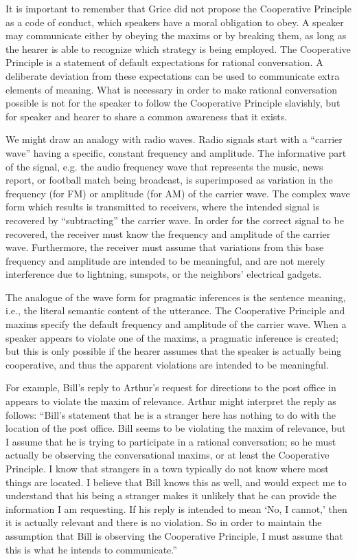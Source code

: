 It is important to remember that Grice did not propose the Cooperative Principle as a code of conduct, which speakers have a moral obligation to obey. A speaker may communicate either by obeying the maxims or by breaking them, as long as the hearer is able to recognize which strategy is being employed. The Cooperative Principle is a statement of default expectations for rational conversation. A deliberate deviation from these expectations can be used to communicate extra elements of meaning. What is necessary in order to make rational conversation possible is not for the speaker to follow the Cooperative Principle slavishly, but for speaker and hearer to share a common awareness that it exists.



We might draw an analogy with radio waves. Radio signals start with a “carrier wave” having a specific, constant frequency and amplitude. The informative part of the signal, e.g. the audio frequency wave that represents the music, news report, or football match being broadcast, is superimposed as variation in the frequency (for FM) or amplitude (for AM) of the carrier wave. The complex wave form which results is transmitted to receivers, where the intended signal is recovered by “subtracting” the carrier wave. In order for the correct signal to be recovered, the receiver must know the frequency and amplitude of the carrier wave. Furthermore, the receiver must assume that variations from this base frequency and amplitude are intended to be meaningful, and are not merely interference due to lightning, sunspots, or the neighbors’ electrical gadgets.



The analogue of the wave form for pragmatic inferences is the sentence meaning, i.e., the literal semantic content of the utterance. The Cooperative Principle and maxims specify the default frequency and amplitude of the carrier wave. When a speaker appears to violate one of the maxims, a pragmatic inference is created; but this is only possible if the hearer assumes that the speaker is actually being cooperative, and thus the apparent violations are intended to be meaningful.



For example, Bill’s reply to Arthur’s request for directions to the post office in  appears to violate the maxim of relevance. Arthur might interpret the reply as follows: “Bill’s statement that he is a stranger here has nothing to do with the location of the post office. Bill seems to be violating the maxim of relevance, but I assume that he is trying to participate in a rational conversation; so he must actually be observing the conversational maxims, or at least the Cooperative Principle. I know that strangers in a town typically do not know where most things are located. I believe that Bill knows this as well, and would expect me to understand that his being a stranger makes it unlikely that he can provide the information I am requesting. If his reply is intended to mean ‘No, I cannot,’ then it is actually relevant and there is no violation. So in order to maintain the assumption that Bill is observing the Cooperative Principle, I must assume that this is what he intends to communicate.”




